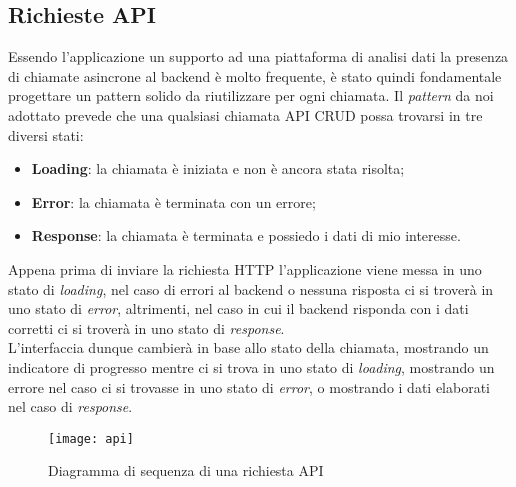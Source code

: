 \subsection{Richieste API}
Essendo l'applicazione un supporto ad una piattaforma di analisi dati la presenza di chiamate asincrone al backend è molto frequente, è stato quindi fondamentale progettare un pattern solido da riutilizzare per ogni chiamata.
Il \textit{pattern} da noi adottato prevede che una qualsiasi chiamata API CRUD possa trovarsi in tre diversi stati:
\begin{itemize}
    \item \textbf{Loading}: la chiamata è iniziata e non è ancora stata risolta;
    \item \textbf{Error}: la chiamata è terminata con un errore;
    \item \textbf{Response}: la chiamata è terminata e possiedo i dati di mio interesse.
\end{itemize}
Appena prima di inviare la richiesta HTTP l'applicazione viene messa in uno stato di \textit{loading}, nel caso di errori al backend o nessuna risposta ci si troverà in uno stato di \textit{error}, altrimenti, nel caso in cui il backend risponda con i dati corretti ci si troverà in uno stato di \textit{response}.\\
L'interfaccia dunque cambierà in base allo stato della chiamata, mostrando un indicatore di progresso mentre ci si trova in uno stato di \textit{loading}, mostrando un errore nel caso ci si trovasse in uno stato di \textit{error}, o mostrando i dati elaborati nel caso di \textit{response}.
\begin{figure}[h!]
    \centering
    \texttt{[image: api]}
    \caption{Diagramma di sequenza di una richiesta API}
\end{figure}

